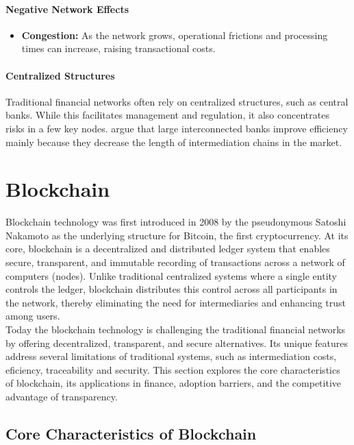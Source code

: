 \paragraph{Negative Network Effects}
\begin{itemize}
    \item \textbf{Congestion:} As the network grows, operational frictions and processing times can increase, raising transactional costs. \cite{hinzen_bitcoins_2022,iyengar_economics_2023} 
\end{itemize}

\paragraph{Centralized Structures}
Traditional financial networks often rely on centralized structures, such as central banks. While this facilitates management and regulation, it also concentrates risks in a few key nodes.  argue that large interconnected banks improve efficiency mainly because
they decrease the length of intermediation chains in the market.  


\section{Blockchain}
Blockchain technology was first introduced in 2008 by the pseudonymous Satoshi Nakamoto as the underlying structure for Bitcoin, the first cryptocurrency. At its core, blockchain is a decentralized and distributed ledger system that enables secure, transparent, and immutable recording of transactions across a network of computers (nodes). Unlike traditional centralized systems where a single entity controls the ledger, blockchain distributes this control across all participants in the network, thereby eliminating the need for intermediaries and enhancing trust among users. \cite{nakamoto_bitcoin_2008} \\ 

Today the blockchain technology is challenging the traditional financial networks by offering decentralized, transparent, and secure alternatives. Its unique features address several limitations of traditional systems, such as intermediation costs, eficiency, traceability and security. This section explores the core characteristics of blockchain, its applications in finance, adoption barriers, and the competitive advantage of transparency.

\subsection{Core Characteristics of Blockchain}

